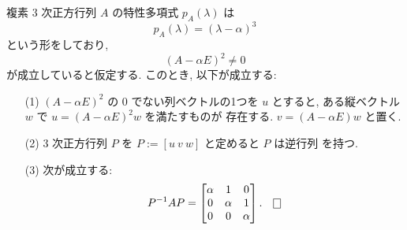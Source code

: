\documentclass[12pt,twoside]{jarticle}
\begin{document}
\begin{question}\label{q:normal-form-3.4}
  複素 $3$ 次正方行列 $A$ の特性多項式 $p_A(\lambda)$ は
  \begin{equation*}
    p_A(\lambda) = (\lambda - \alpha)^3
  \end{equation*}
  という形をしており,
  \begin{equation*}
    (A - \alpha E)^2 \ne 0
  \end{equation*}
  が成立していると仮定する.  このとき, 以下が成立する:
  \begin{enumerate}
  \item[(1)] $(A - \alpha E)^2$ の $0$ でない列ベクトルの1つを $u$ とすると, 
    ある縦ベクトル $w$ で $u = (A - \alpha E)^2 w$ を満たすものが
    存在する.  $v = (A - \alpha E)w$ と置く.
  \item[(2)] $3$ 次正方行列 $P$ を $P := [u\ v\ w]$ と定めると $P$ は逆行列
    を持つ. 
  \item[(3)] 次が成立する:
    \begin{equation*}
      P^{-1} A P 
      = 
      \begin{bmatrix}
        \alpha & 1 & 0 \\
        0 & \alpha & 1 \\
        0 & 0 & \alpha \\
      \end{bmatrix}.
      \qed
    \end{equation*}
  \end{enumerate}
\end{question}

\end{document}
